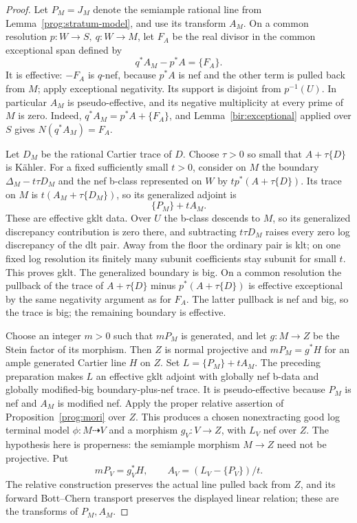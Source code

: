 \begin{proof}
Let \(P_M=J_M\) denote the semiample rational line from
Lemma~\ref{prog:stratum-model}, and use its transform \(A_M\).
On a common resolution \(p:W\to S,\ q:W\to M\), let \(F_A\) be the
real divisor in the common exceptional span defined by
\[
 q^*A_M-p^*A=\{F_A\}.
\]
It is effective: \(-F_A\) is \(q\)-nef, because \(p^*A\) is
nef and the other term is pulled back from \(M\); apply
exceptional negativity. Its support is disjoint from \(p^{-1}(U)\).
In particular \(A_M\) is pseudo-effective, and its negative
multiplicity at every prime of \(M\) is zero.  Indeed,
\(q^*A_M=p^*A+\{F_A\}\), and
Lemma~\ref{bir:exceptional} applied over \(S\) gives
\(N(q^*A_M)=F_A\).

Let \(D_M\) be the rational Cartier trace of \(D\).
Choose \(\tau>0\) so small that \(A+\tau\{D\}\) is Kähler.
For a fixed sufficiently small \(t>0\), consider on \(M\) the
boundary \(\Delta_M-t\tau D_M\) and the nef b-class represented on
\(W\) by \(t p^*(A+\tau\{D\})\). Its trace on \(M\) is
\(t(A_M+\tau\{D_M\})\), so its generalized adjoint is
\begin{equation}
 \{P_M\}+tA_M.
 \label{prog:interval-gadjoint}
\end{equation}
These are effective gklt data.  Over \(U\) the b-class
descends to \(M\), so its generalized discrepancy
contribution is zero there, and subtracting \(t\tau D_M\)
raises every zero log discrepancy of the dlt pair.
Away from the floor the ordinary pair is klt; on one fixed
log resolution its finitely many subunit coefficients stay
subunit for small \(t\).  This proves gklt.  The generalized
boundary is big.  On a common resolution the pullback of the
trace of \(A+\tau\{D\}\) minus \(p^*(A+\tau\{D\})\) is effective exceptional
by the same negativity argument as for \(F_A\).  The latter
pullback is nef and big, so the trace is big; the remaining
boundary is effective.

Choose an integer \(m>0\) such that \(mP_M\) is generated, and
let \(g:M\to Z\) be the Stein factor of its morphism. Then \(Z\)
is normal projective and \(mP_M=g^*H\) for an ample generated Cartier line
\(H\) on \(Z\). Set \(L=\{P_M\}+tA_M\). The preceding
preparation makes \(L\) an effective gklt adjoint with globally nef
b-data and globally modified-big boundary-plus-nef trace. It is
pseudo-effective because \(P_M\) is nef and \(A_M\) is modified
nef. Apply the proper relative assertion of
Proposition~\ref{prog:mori} over \(Z\). This produces a chosen
nonextracting good log terminal model \(\phi:M\dashrightarrow V\)
and a morphism \(g_V:V\to Z\), with \(L_V\) nef over \(Z\).
The hypothesis here is properness: the semiample morphism \(M\to Z\)
need not be projective. Put
\[
             mP_V=g_V^*H,\qquad A_V=(L_V-\{P_V\})/t.
\]
The relative construction preserves the actual line pulled back from
\(Z\), and its forward Bott--Chern transport preserves the displayed
linear relation; these are the transforms of \(P_M,A_M\).


\end{proof}
